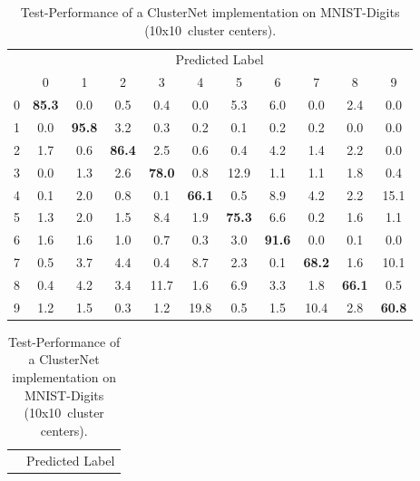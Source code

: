\documentclass{article}
\begin{document}
\vspace{-3mm}
\begin{table}[hbt!]
    \caption{Test-Performance of a ClusterNet implementation on MNIST-Digits (10x10~cluster centers).} \label{tab:imageclass}
    \begin{subtable}{0.5\linewidth}
        \centering
        \scriptsize
        \tabcolsep=0.10cm
        \begin{tabular}{c|c c c c c c c c c c |}
            & \multicolumn{10}{c}{Predicted Label} \\
            & 0 & 1 & 2 & 3 & 4 & 5 & 6 & 7 & 8 & 9 \\ 
          \hline
            0 & \textbf{85.3} & 0.0 & 0.5 & 0.4 & 0.0 & 5.3 & 6.0 & 0.0 & 2.4 & 0.0 \\
            1 & 0.0 & \textbf{95.8} & 3.2 & 0.3 & 0.2 & 0.1 & 0.2 & 0.2 & 0.0 & 0.0 \\
            2 & 1.7 & 0.6 & \textbf{86.4} & 2.5 & 0.6 & 0.4 & 4.2 & 1.4 & 2.2 & 0.0 \\
            3 & 0.0 & 1.3 & 2.6 & \textbf{78.0} & 0.8 & 12.9 & 1.1 & 1.1 & 1.8 & 0.4 \\
            4 & 0.1 & 2.0 & 0.8 & 0.1 & \textbf{66.1} & 0.5 & 8.9 & 4.2 & 2.2 & 15.1 \\
            5 & 1.3 & 2.0 & 1.5 & 8.4 & 1.9 & \textbf{75.3} & 6.6 & 0.2 & 1.6 & 1.1 \\
            6 & 1.6 & 1.6 & 1.0 & 0.7 & 0.3 & 3.0 & \textbf{91.6} & 0.0 & 0.1 & 0.0 \\
            7 & 0.5 & 3.7 & 4.4 & 0.4 & 8.7 & 2.3 & 0.1 & \textbf{68.2} & 1.6 & 10.1 \\
            8 & 0.4 & 4.2 & 3.4 & 11.7 & 1.6 & 6.9 & 3.3 & 1.8 & \textbf{66.1} & 0.5 \\
            9 & 1.2 & 1.5 & 0.3 & 1.2 & 19.8 & 0.5 & 1.5 & 10.4 & 2.8 & \textbf{60.8}
        \end{tabular}
         \label{tab:mnist1}
  \end{subtable}
  \begin{subtable}{0.5\linewidth}
        \centering
        \scriptsize
        \tabcolsep=0.10cm
        \begin{tabular}{c| c c c c c c c c c c |}
            & \multicolumn{10}{c}{Predicted Label} \\

\end{tabular}
\end{subtable}
\end{table}
\end{document}
